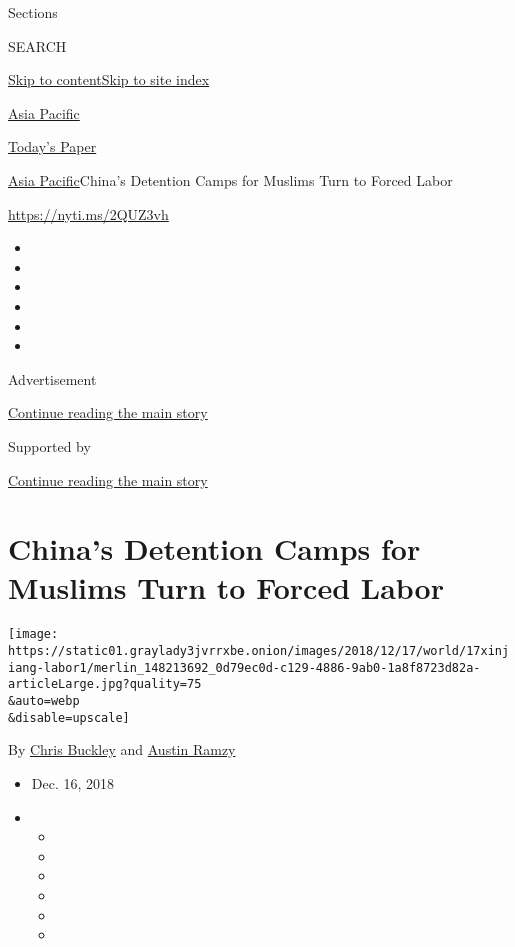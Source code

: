 Sections

SEARCH

\protect\hyperlink{site-content}{Skip to
content}\protect\hyperlink{site-index}{Skip to site index}

\href{https://www.nytimes3xbfgragh.onion/section/world/asia}{Asia
Pacific}

\href{https://myaccount.nytimes3xbfgragh.onion/auth/login?response_type=cookie\&client_id=vi}{}

\href{https://www.nytimes3xbfgragh.onion/section/todayspaper}{Today's
Paper}

\href{/section/world/asia}{Asia Pacific}\textbar{}China's Detention
Camps for Muslims Turn to Forced Labor

\url{https://nyti.ms/2QUZ3vh}

\begin{itemize}
\item
\item
\item
\item
\item
\item
\end{itemize}

Advertisement

\protect\hyperlink{after-top}{Continue reading the main story}

Supported by

\protect\hyperlink{after-sponsor}{Continue reading the main story}

\hypertarget{chinas-detention-camps-for-muslims-turn-to-forced-labor}{%
\section{China's Detention Camps for Muslims Turn to Forced
Labor}\label{chinas-detention-camps-for-muslims-turn-to-forced-labor}}

\texttt{[image: https://static01.graylady3jvrrxbe.onion/images/2018/12/17/world/17xinjiang-labor1/merlin\_148213692\_0d79ec0d-c129-4886-9ab0-1a8f8723d82a-articleLarge.jpg?quality=75\\\&auto=webp\\\&disable=upscale]}

By \href{https://www.nytimes3xbfgragh.onion/by/chris-buckley}{Chris
Buckley} and
\href{https://www.nytimes3xbfgragh.onion/by/austin-ramzy}{Austin Ramzy}

\begin{itemize}
\item
  Dec. 16, 2018
\item
  \begin{itemize}
  \item
  \item
  \item
  \item
  \item
  \item
  \end{itemize}
\end{itemize}

